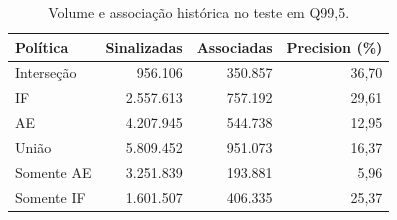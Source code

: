 \begin{table}[htbp]
\centering\small
\caption{Volume e associação histórica no teste em Q99,5.}
\label{tab:custo-marginal}
\begin{tabular}{@{}lrrr@{}}
\toprule
Política & Sinalizadas & Associadas & Precision (\%) \\
\midrule
Interseção & 956.106 & 350.857 & 36,70 \\
IF & 2.557.613 & 757.192 & 29,61 \\
AE & 4.207.945 & 544.738 & 12,95 \\
União & 5.809.452 & 951.073 & 16,37 \\
Somente AE & 3.251.839 & 193.881 & 5,96 \\
Somente IF & 1.601.507 & 406.335 & 25,37 \\
\bottomrule
\end{tabular}
\end{table}
